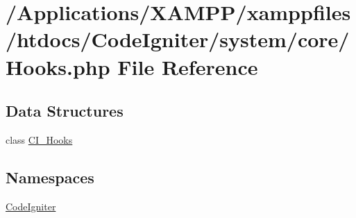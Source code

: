 \hypertarget{system_2core_2hooks_8php}{}\section{/\+Applications/\+X\+A\+M\+P\+P/xamppfiles/htdocs/\+Code\+Igniter/system/core/\+Hooks.php File Reference}
\label{system_2core_2hooks_8php}
\subsection*{Data Structures}
\begin{DoxyCompactItemize}
\item 
class \mbox{\hyperlink{class_c_i___hooks}{C\+I\+\_\+\+Hooks}}
\end{DoxyCompactItemize}
\subsection*{Namespaces}
\begin{DoxyCompactItemize}
\item 
 \mbox{\hyperlink{namespace_code_igniter}{Code\+Igniter}}
\end{DoxyCompactItemize}
